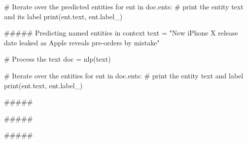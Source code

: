 # Iterate over the predicted entities
for ent in doc.ents:
    # print the entity text and its label
    print(ent.text, ent.label_)


##### Predicting named entities in context
text = "New iPhone X release date leaked as Apple reveals pre-orders by mistake"

# Process the text
doc = nlp(text)

# Iterate over the entities
for ent in doc.ents:
    # print the entity text and label
    print(ent.text, ent.label_)




##### 





##### 





##### 





